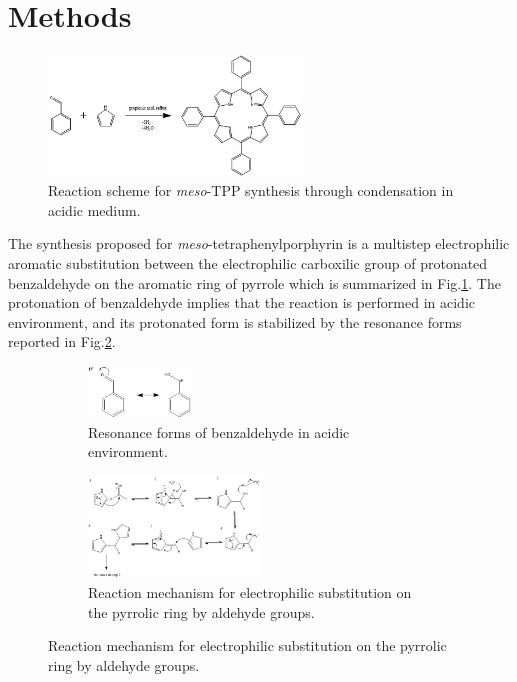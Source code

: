 \documentclass[num-refs]{wiley-article}
\begin{document}
\twocolumn
\section{Methods}
\begin{figure}[t!]
        \centering
        \includegraphics[width=0.6\textwidth]{reaction}
        \caption{Reaction scheme for \textit{meso}-TPP synthesis through condensation in acidic medium.}
        \label{reaction}
\end{figure}
The synthesis proposed for \textit{meso}-tetraphenylporphyrin is a multistep electrophilic aromatic substitution between the electrophilic carboxilic group of protonated benzaldehyde on the aromatic ring of pyrrole which is summarized in Fig.\ref{reaction}.
The protonation of benzaldehyde implies that the reaction is performed in acidic environment, and its protonated form is stabilized by the resonance forms reported in Fig.\ref{res-benz}.\\
\begin{figure}[b!]
    \centering
    \begin{subfigure}
        \centering
        \includegraphics[width=0.3\textwidth]{resonance-benzaldehyde}
        \caption{Resonance forms of benzaldehyde in acidic environment.}
        \label{res-benz}
    \end{subfigure}
    \begin{subfigure}
        \centering
        \includegraphics[width=0.5\textwidth]{mechanism}
        \caption{Reaction mechanism for electrophilic substitution on the pyrrolic ring by aldehyde groups.}
        \label{mechanism}
    \end{subfigure}
\end{figure}
\end{document}

